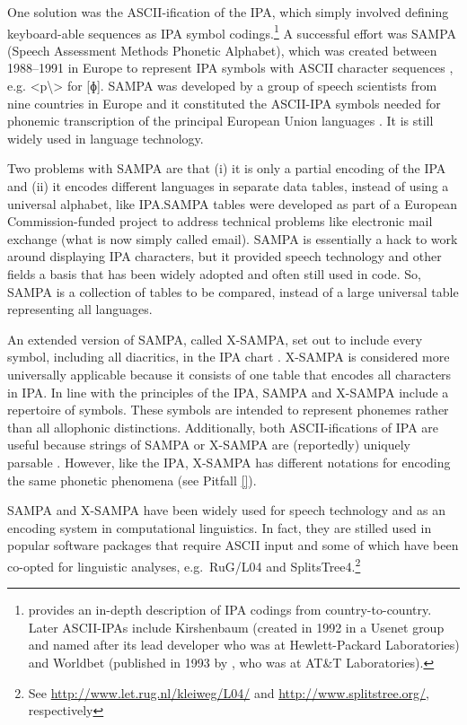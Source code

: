 One solution was the ASCII-ification of the IPA, which simply involved 
defining keyboard-able sequences as IPA symbol codings.\footnote{\cite{Wells1987} 
provides an in-depth description of IPA codings from country-to-country. 
Later ASCII-IPAs include Kirshenbaum (created in 1992 in a Usenet group and 
named after its lead developer who was at Hewlett-Packard Laboratories) and 
Worldbet (published in 1993 by \cite{Hieronymus1993}, who was at AT\&T Laboratories).} 
A successful effort was SAMPA (Speech Assessment
Methods Phonetic Alphabet), which was created between 1988--1991 in Europe to 
represent IPA symbols with ASCII
character sequences \citep{Wells1987,Wells_etal1992}, e.g. <p\textbackslash> 
for [ɸ]. SAMPA was developed by a group of speech scientists from nine countries 
in Europe and it constituted the ASCII-IPA symbols needed for phonemic transcription 
of the principal European Union languages \citep{Wells1995}. It is still widely 
used in language technology.

Two problems with SAMPA are that (i) it is only a partial encoding of the IPA and (ii) it encodes different
languages in separate data tables, instead of using a universal alphabet, like
IPA.\@ SAMPA tables were developed as part of a European Commission-funded project to
address technical problems like electronic mail exchange (what is now simply
called email). SAMPA is essentially a hack to work around displaying IPA
characters, but it provided speech technology and other fields a basis that has
been widely adopted and often still used in code. So, SAMPA is a collection of tables to be
compared, instead of a large universal table representing all languages. 

An extended version of SAMPA, called X-SAMPA, set out to include every symbol, 
including all diacritics, in the IPA chart \citep{Wells1995}. X-SAMPA is considered
more universally applicable because it consists of one table that encodes all
characters in IPA. In line with the principles of the IPA, SAMPA and X-SAMPA include a 
repertoire of symbols. These symbols are intended to represent phonemes rather than 
all allophonic distinctions. Additionally, both ASCII-ifications of IPA are useful because 
strings of SAMPA or X-SAMPA are (reportedly) uniquely parsable \citep{Wells1995}. However, 
like the IPA, X-SAMPA has different notations for encoding the same phonetic phenomena 
(see Pitfall \ref{}).

SAMPA and X-SAMPA have been widely used for speech technology and as an encoding system in
computational linguistics. In fact, they are stilled used in popular software packages 
that require ASCII input and some of which have been co-opted for linguistic analyses, 
e.g.~RuG/L04 and SplitsTree4.\footnote{See \url{http://www.let.rug.nl/kleiweg/L04/} and 
\url{http://www.splitstree.org/}, respectively}


